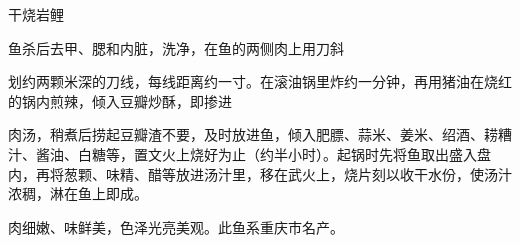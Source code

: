 \begin{recipe}{干烧岩鲤}

\ingredients





\cooking

鱼杀后去甲、腮和内脏，洗净，在鱼的两侧肉上用刀斜

划约两颗米深的刀线，每线距离约一寸。在滚油锅里炸约一分钟，再用猪油在烧红的锅内煎辣，倾入豆瓣炒酥，即掺进

肉汤，稍煮后捞起豆瓣渣不要，及时放进鱼，倾入肥膘、蒜米、姜米、绍酒、耢糟汁、酱油、白糖等，置文火上烧好为止（约半小时）。起锅时先将鱼取出盛入盘内，再将葱颗、味精、醋等放进汤汁里，移在武火上，烧片刻以收干水份，使汤汁浓稠，淋在鱼上即成。

\notes

肉细嫩、味鲜美，色泽光亮美观。此鱼系重庆市名产。

\end{recipe}

